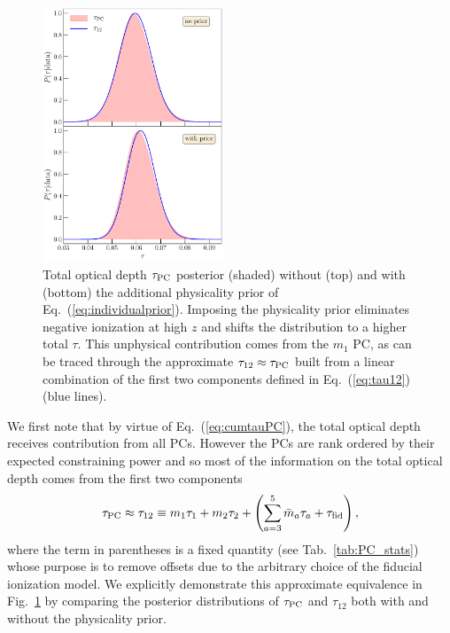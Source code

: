 \documentclass[prd,twocolumn,amsmath,amssymb,floatfix,superscriptaddress,nofootinbib]{revtex4-1}
\newcommand{\beq}{\begin{equation}}
\newcommand{\eeq}{\end{equation}}
\begin{document}
\begin{figure}[ht]
\includegraphics[width=0.48\textwidth]{paper/plots/plot_tau12_new_apply_cut_False_vs_True_pl18_pc_zmax30_pliklite_srollv2_1015_two_panels.pdf}
\caption{Total optical depth $\tau_{\rm PC}$ posterior (shaded) without (top) and with (bottom) the additional physicality prior of Eq.~(\ref{eq:individualprior}).  
Imposing the physicality prior eliminates negative ionization at high $z$ and shifts the distribution to a higher total $\tau$. This unphysical contribution comes from the $m_1$ PC, as can be traced through the approximate $\tau_{12} \approx \tau_{\rm PC}$ built from a linear combination of the first two components defined in Eq.~(\ref{eq:tau12}) (blue lines).}
\label{fig:tau12}
\end{figure}


 We first note that by virtue of Eq.~(\ref{eq:cumtauPC}), the total optical depth receives contribution from all PCs.  However the PCs are rank ordered by their expected constraining power and so most of the information on the total optical depth comes from
the first two components
\beq
\tau_{\rm PC} \approx \tau_{12} \equiv  m_1 \tau_1 + m_2 \tau_2 +
\left(\sum_{a=3}^5 \bar m_a \tau_a + \tau_{\rm fid}\right) ,
\label{eq:tau12}
\eeq
where the term in parentheses is a fixed quantity (see Tab.~\ref{tab:PC_stats}) whose purpose is to remove offsets due to the arbitrary choice of the fiducial ionization model.  We explicitly demonstrate this approximate equivalence in Fig.~\ref{fig:tau12} by comparing the
posterior distributions of $\tau_{\rm PC}$ and $\tau_{12}$ both with and without the physicality prior.  
\end{document}
